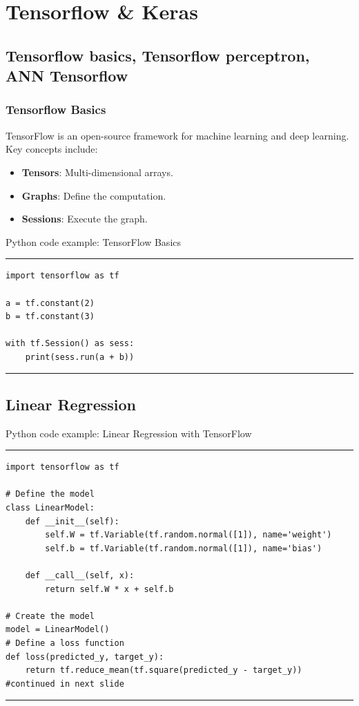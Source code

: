 \documentclass[aspectratio=169, hideothersubsections]{beamer}
\begin{document}
\section{Tensorflow \& Keras}

\subsection{Tensorflow basics, Tensorflow perceptron, ANN Tensorflow}
\begin{frame}
\frametitle{Tensorflow Basics}
TensorFlow is an open-source framework for machine learning and deep learning. Key concepts include:
\begin{itemize}
    \item \textbf{Tensors}: Multi-dimensional arrays.
    \item \textbf{Graphs}: Define the computation.
    \item \textbf{Sessions}: Execute the graph.
\end{itemize}
\end{frame}

\begin{frame}[fragile]{Python code example: TensorFlow Basics}
\rule{\textwidth}{1pt}
\scriptsize
\begin{verbatim}
import tensorflow as tf

a = tf.constant(2)
b = tf.constant(3)

with tf.Session() as sess:
    print(sess.run(a + b))
\end{verbatim}
\rule{\textwidth}{1pt}
\end{frame}

\subsection{Linear Regression}
\begin{frame}[fragile]{Python code example: Linear Regression with TensorFlow}
\rule{\textwidth}{1pt}
\scriptsize
\begin{verbatim}
import tensorflow as tf

# Define the model
class LinearModel:
    def __init__(self):
        self.W = tf.Variable(tf.random.normal([1]), name='weight')
        self.b = tf.Variable(tf.random.normal([1]), name='bias')

    def __call__(self, x):
        return self.W * x + self.b

# Create the model
model = LinearModel()
# Define a loss function
def loss(predicted_y, target_y):
    return tf.reduce_mean(tf.square(predicted_y - target_y))
#continued in next slide
\end{verbatim}
\rule{\textwidth}{1pt}
\end{frame}
\end{document}
